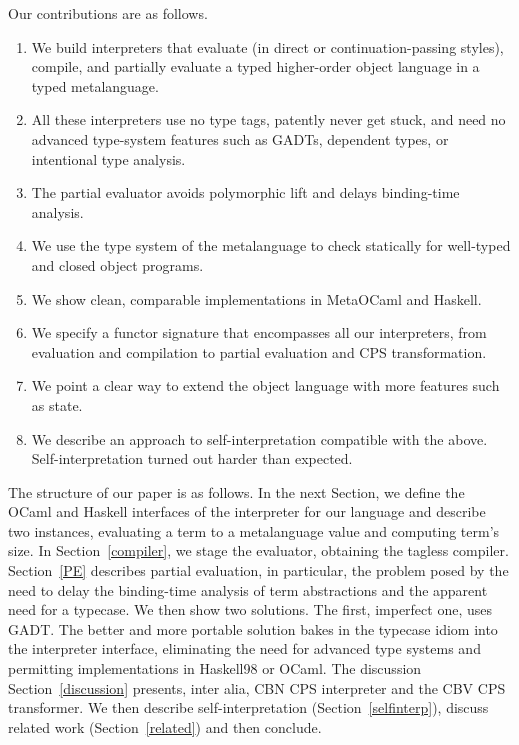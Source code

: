\documentclass[preprint]{sigplanconf}
\begin{document}
Our contributions are as follows.
\begin{enumerate}
\item We build interpreters that evaluate (in direct or continuation\hyp passing styles),
  compile, and partially evaluate a typed higher-order object language
   in a typed metalanguage.
\item All these interpreters use no type tags, patently never get stuck,
    and need no advanced type-system features such as GADTs, dependent types,
    or intentional type analysis.
\item The partial evaluator avoids polymorphic lift and delays binding-time
    analysis.
\item We use the type system of the metalanguage
    to check statically for well-typed and closed object programs.
\item We show clean, comparable implementations in MetaOCaml and Haskell.
\item We specify a functor signature that encompasses all our interpreters, from
    evaluation and compilation to partial evaluation and CPS transformation.
\item We point a clear way to extend the object language with more features
  such as state.
\item We describe an approach to self\hyp interpretation compatible with the
  above.  Self\hyp interpretation turned out harder than expected.
\end{enumerate}


The structure of our paper is as follows. In the next Section, we
define the OCaml and Haskell interfaces of the interpreter for our
language and describe two instances, evaluating a term to a
metalanguage value and computing term's size. In
Section~\ref{compiler}, we stage the evaluator, obtaining the tagless
compiler. Section~\ref{PE} describes partial evaluation, in
particular, the problem posed by the need to delay the 
binding-time analysis of term abstractions and the apparent 
need for a typecase. We then show two solutions. The first, imperfect
one, uses GADT. The better and more portable solution bakes in the
typecase idiom into the interpreter interface, eliminating the need for
advanced type systems and permitting implementations in Haskell98 or OCaml.
The discussion Section~\ref{discussion} presents, inter alia, CBN CPS
interpreter and the CBV CPS transformer. We then describe 
self-interpretation (Section~\ref{selfinterp}),
discuss related work (Section~\ref{related}) and then conclude.
\end{document}
